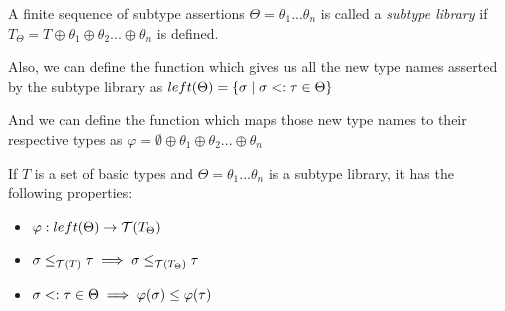 \documentclass[main.tex]{subfiles}
\begin{document}
\begin{defn}
    A finite sequence of subtype assertions
    $\Theta = \theta_1 ... \theta_n$ is called a \emph{subtype library}
    if $T_{\Theta} = T \oplus \theta_1 \oplus \theta_2 ... \oplus \theta_n$ is defined.

    Also, we can define the function which gives us all the new type names
    asserted by the subtype library as
    $left(\Theta) = \{ \sigma \mid \sigma <: \tau \in \Theta \}$

    And we can define the function which maps those new type names to their
    respective types as
    $\varphi = \emptyset \oplus \theta_1 \oplus \theta_2 ... \oplus \theta_n$
\end{defn}

\begin{prop}
    If $T$ is a set of basic types and
    $\Theta = \theta_1 ... \theta_n$ is a subtype library, it has the
    following properties:
    \begin{itemize}
        \item $\varphi : left(\Theta) \rightarrow \mathcal{T}( T_{\Theta} )$
        \item $\sigma \leq_{\mathcal{T}( T )} \tau \implies \sigma \leq_{\mathcal{T}( T_{\Theta} )} \tau$
        \item $\sigma <: \tau \in \Theta \implies \varphi(\sigma) \leq \varphi(\tau)$
    \end{itemize}
\end{prop}
\end{document}
